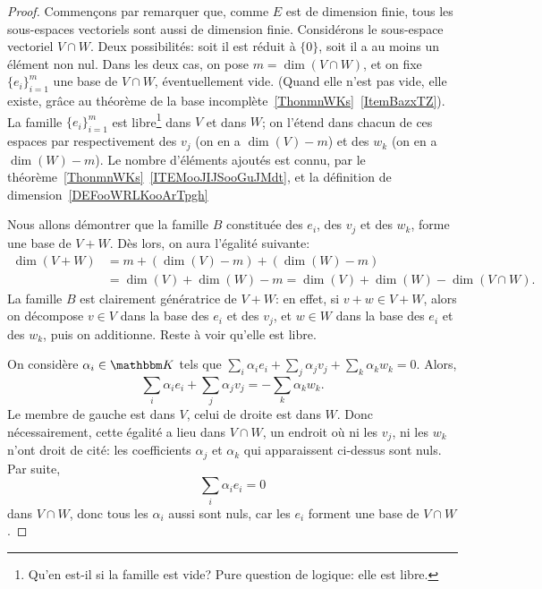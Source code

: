 \begin{proof}
    Commençons par remarquer que, comme \( E \) est de dimension finie, tous les sous-espaces vectoriels sont aussi de dimension finie. Considérons le sous-espace vectoriel \( V \cap W \). Deux possibilités: soit il est réduit à \( \{0\}\), soit il a au moins un élément non nul. Dans les deux cas, on pose \( m = \dim(V \cap W) \), et on fixe \( \{e_i\}_{i=1}^m \) une base de \( V \cap W\), éventuellement vide. (Quand elle n'est pas vide, elle existe, grâce au théorème de la base incomplète~\ref{ThonmnWKs}~\ref{ItemBazxTZ}). La famille  \( \{e_i\}_{i=1}^m \) est libre\footnote{Qu'en est-il si la famille est vide? Pure question de logique: elle est libre.} dans \( V \) et dans \( W \); on l'étend dans chacun de ces espaces par respectivement des \( v_j \) (on en a \( \dim(V) - m \)) et des \( w_k \) (on en a \( \dim(W) - m \)). Le nombre d'éléments ajoutés est connu, par le théorème~\ref{ThonmnWKs}~\ref{ITEMooJIJSooGuJMdt}, et la définition de dimension~\ref{DEFooWRLKooArTpgh}
    
    Nous allons démontrer que la famille \( B \) constituée des \( e_i \), des \( v_j \) et des \(w_k \), forme une base de \( V + W \). Dès lors, on aura l'égalité suivante:
    \begin{align}
      \dim(V+W) &= m + (\dim(V) - m) + (\dim(W) - m )\\
      & = \dim(V)+\dim(W) - m = \dim(V)+\dim(W)-\dim(V\cap W).
    \end{align}
    La famille \(B \) est clairement génératrice de \( V + W \): en effet, si \( v + w \in V + W \), alors on décompose \( v \in V \) dans la base des  \( e_i \) et des \( v_j \), et \( w \in W \) dans la base des \( e_i \) et des \( w_k \), puis on additionne. Reste à voir qu'elle est libre.
    
    On considère \( \alpha_i \in \eK \) tels que \( \sum_i \alpha_i e_i + \sum_j \alpha_j v_j + \sum_k \alpha_k w_k = 0 \). Alors,
    \begin{equation}
         \sum_i \alpha_i e_i + \sum_j \alpha_j v_j = - \sum_k \alpha_k w_k.
    \end{equation}
    Le membre de gauche est dans \( V \), celui de droite est dans \( W \). Donc nécessairement, cette égalité a lieu dans \( V \cap W\), un endroit où ni les \( v_j \), ni les \( w_k \) n'ont droit de cité: les coefficients \( \alpha_j \) et \( \alpha_k \) qui apparaissent ci-dessus sont nuls. Par suite,
        \begin{equation}
         \sum_i \alpha_i e_i = 0
    \end{equation}
    dans \( V \cap W \), donc tous les \( \alpha_i \) aussi sont nuls, car les \( e_i \) forment une base de \( V \cap W \).
\end{proof}


